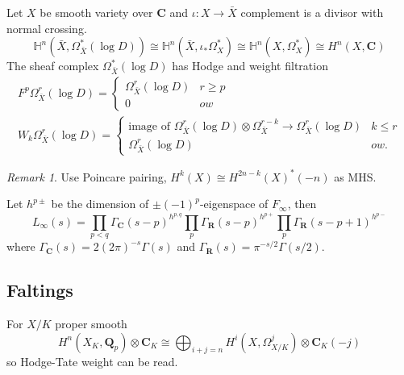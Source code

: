 \documentclass[leqno]{amsart}
\newcommand{\Qp}{\mathbf{Q}_p}
\newcommand{\R}{\mathbf R}
\newcommand{\C}{\mathbf C}
\newcommand{\1}{\mathbf{1}}
\theoremstyle{definition}
\theoremstyle{remark}
\newtheorem{rem}[thm]{Remark}
\begin{document}
Let $X$ be smooth variety over  $\C$
and  $\iota\colon X\to \bar{X}$
complement is  a divisor with normal crossing.
\[
	\mathbb{H}^n(\bar{X},\Omega^*_{\bar{X}}(\log D))\cong
	\mathbb{H}^n(\bar{X},\iota_*\Omega^*_{X})\cong
	\mathbb{H}^n(X,\Omega^*_{X})\cong
	H^n(X,\C)
\]
The sheaf complex $\Omega^*_{\bar{X}}(\log D)$
has Hodge and weight filtration
\begin{align*}
	F^p\Omega^r_{\bar{X}}(\log D)=
	\begin{cases}
		\Omega^r_{\bar{X}}(\log D) & r\geq p\\
		0 & ow
	\end{cases}\\
	W_k\Omega^r_{\bar{X}}(\log D)=
	\begin{cases}
		\text{image of }
		\Omega^r_{\bar{X}}(\log D)\otimes
		\Omega^{r-k}_{\bar{X}}\to
		\Omega^r_{\bar{X}}(\log D) & k\leq r\\
		\Omega^r_{\bar{X}}(\log D) & ow.
	\end{cases}
\end{align*}

\begin{rem}
	Use Poincare pairing,
	$H^k(X)\cong H^{2n-k}(X)^*(-n)$ 
	as MHS.
\end{rem}

Let $h^{p\pm}$ 
be the dimension of $\pm(-1)^p$-eigenspace of  $F_\infty$,
then
 \[
	 L_\infty(s)=
	 \prod_{p<q}\Gamma_\C(s-p)^{h^{p,q}}
	 \prod_{p}\Gamma_\R(s-p)^{h^{p+}}
	 \prod_{p}\Gamma_\R(s-p+1)^{h^{p-}}
\]
where $\Gamma_\C(s)=2(2\pi)^{-s}\Gamma(s)$
and $\Gamma_\R(s)=\pi^{-s/2}\Gamma(s/2)$.

\subsection{Faltings}
For $X/K$ proper smooth
 \[
	 H^n(X_{K},\Qp)\otimes \C_K\cong
	 \bigoplus_{i+j=n}
	 H^i(X,\Omega^j_{X/K})\otimes \C_K(-j)
\]
so Hodge-Tate weight can be read.

\end{document}
